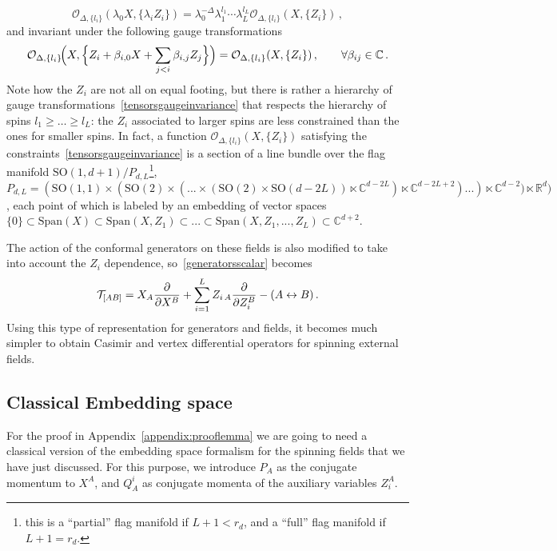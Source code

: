 \documentclass{article}
\begin{document}
	\begin{equation}
    \mathcal{O}_{\Delta,\{l_i\}}\!\left(\lambda_0 X, \{ \lambda_i Z_i\}\right)=\lambda_0^{-\Delta}\lambda_1^{l_1}\cdots \lambda_L^{l_L} \mathcal{O}_{\Delta,\{l_i\}}(X,\{Z_i\})\,,
    \label{tensorshomogeneityconditions}
\end{equation}
    and invariant under the following gauge transformations
    \begin{equation}
    \mathcal{O}_{\Delta,\{l_i\}}\!\Bigl(X,\Bigl\{Z_i+\beta_{i,0} X +\sum_{j<i} \beta_{i,j} Z_j\Bigr\}\Bigr)=\mathcal{O}_{\Delta,\{l_i\}}(X,\{Z_i\})\,, \qquad \forall \beta_{ij}\in \mathbb{C}\,.
    \label{tensorsgaugeinvariance}
\end{equation}
    Note how the $Z_i$ are not all on equal footing, but there is rather a hierarchy of gauge transformations~\eqref{tensorsgaugeinvariance} that respects the hierarchy of spins $l_1\ge \dots \ge l_L$: the $Z_i$ associated to larger spins are less constrained than the ones for smaller spins. In fact, a function $\mathcal{O}_{\Delta,\{l_i\}}(X,\{Z_i\})$ satisfying the constraints~\eqref{tensorsgaugeinvariance} is a section of a line bundle over the flag manifold $\mathrm{SO}(1,d+1)/P_{d,L}$\footnote{this is a ``partial'' flag manifold if $L+1< r_d$, and a ``full'' flag manifold if $L+1 = r_d$.}, $P_{d,L} = ( \mathrm{SO}(1,1) \times (\mathrm{SO}(2) \times ( ... \times ( \mathrm{SO}(2) \times \mathrm{SO}(d-2L) ) \ltimes \mathbb{C}^{d-2L} ) \ltimes \mathbb{C}^{d-2L+2} ) ... ) \ltimes \mathbb{C}^{d-2} ) \ltimes \mathbb{R}^d)$, each point of which is labeled by an embedding of vector spaces $\{0\} \subset \mathrm{Span}(X) \subset \mathrm{Span}(X,Z_1)\subset ... \subset \mathrm{Span}(X,Z_1,...,Z_L) \subset \mathbb{C}^{d+2}$. 
    
	The action of the conformal generators on these fields is also modified to take into account the $Z_i$ dependence, so~\eqref{generatorsscalar} becomes
	\begin{equation}
    \mathcal{T}_{[AB]}=X_A\pdv{X^B}+\sum_{i=1}^L Z_{i\,A}\pdv{Z^{B}_i} - (A\leftrightarrow B)\,.
    \label{generatorsspinningembedding}
    \end{equation}
	Using this type of representation for generators and fields, it becomes much simpler to obtain Casimir and vertex differential operators for spinning external fields.
	
	\subsection{Classical Embedding space}
	\label{sect:ClassicalEmbSp}
	For the proof in Appendix~\ref{appendix:prooflemma} we are going to need a classical version of the embedding space formalism for the spinning fields that we have just discussed. For this purpose, we introduce $P_A$ as the conjugate momentum to $X^A$, and $Q_A^i$ as conjugate momenta of the auxiliary variables $Z_i^A$.
	
\end{document}
